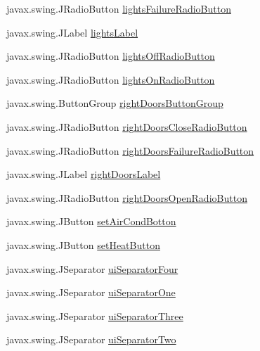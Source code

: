\begin{DoxyCompactItemize}
\item 
javax.\+swing.\+J\+Radio\+Button \hyperlink{classTrainControllerComps_1_1TCUtilityPanel_a91f16bd428853a05f43ff189b237f705}{lights\+Failure\+Radio\+Button}
\item 
javax.\+swing.\+J\+Label \hyperlink{classTrainControllerComps_1_1TCUtilityPanel_af2cdc472f3b510100176138d8c5c0493}{lights\+Label}
\item 
javax.\+swing.\+J\+Radio\+Button \hyperlink{classTrainControllerComps_1_1TCUtilityPanel_a6325ef6b6e5c69f71bae4538aefa3bfe}{lights\+Off\+Radio\+Button}
\item 
javax.\+swing.\+J\+Radio\+Button \hyperlink{classTrainControllerComps_1_1TCUtilityPanel_a0a484b54e0b991752fb2fa1788e268b5}{lights\+On\+Radio\+Button}
\item 
javax.\+swing.\+Button\+Group \hyperlink{classTrainControllerComps_1_1TCUtilityPanel_ab4cb4613175b48a255aeed64c1910691}{right\+Doors\+Button\+Group}
\item 
javax.\+swing.\+J\+Radio\+Button \hyperlink{classTrainControllerComps_1_1TCUtilityPanel_a39b8a85bdbdb1d4b02e37ca2566e3a26}{right\+Doors\+Close\+Radio\+Button}
\item 
javax.\+swing.\+J\+Radio\+Button \hyperlink{classTrainControllerComps_1_1TCUtilityPanel_af612e6cbd2b7ff322efa14546b49353f}{right\+Doors\+Failure\+Radio\+Button}
\item 
javax.\+swing.\+J\+Label \hyperlink{classTrainControllerComps_1_1TCUtilityPanel_af2876ce638568941d0c05c9b4b6c87ab}{right\+Doors\+Label}
\item 
javax.\+swing.\+J\+Radio\+Button \hyperlink{classTrainControllerComps_1_1TCUtilityPanel_a768382520a1795cac4d3c783ea404ba6}{right\+Doors\+Open\+Radio\+Button}
\item 
javax.\+swing.\+J\+Button \hyperlink{classTrainControllerComps_1_1TCUtilityPanel_ae164822c9449c03c919a34c75a3865d6}{set\+Air\+Cond\+Botton}
\item 
javax.\+swing.\+J\+Button \hyperlink{classTrainControllerComps_1_1TCUtilityPanel_aaca3310ec4adf1deeb7420a0ce7003d7}{set\+Heat\+Button}
\item 
javax.\+swing.\+J\+Separator \hyperlink{classTrainControllerComps_1_1TCUtilityPanel_abd79cdd0490231c6b3bb36c364f29365}{ui\+Separator\+Four}
\item 
javax.\+swing.\+J\+Separator \hyperlink{classTrainControllerComps_1_1TCUtilityPanel_a63ffac7089464e92a93e10062b0aabad}{ui\+Separator\+One}
\item 
javax.\+swing.\+J\+Separator \hyperlink{classTrainControllerComps_1_1TCUtilityPanel_a7a48d3f3dd273c406a598cdc906b799b}{ui\+Separator\+Three}
\item 
javax.\+swing.\+J\+Separator \hyperlink{classTrainControllerComps_1_1TCUtilityPanel_aeba9dbe4e8d60298e29d5e30a2ddfdf6}{ui\+Separator\+Two}
\end{DoxyCompactItemize}



